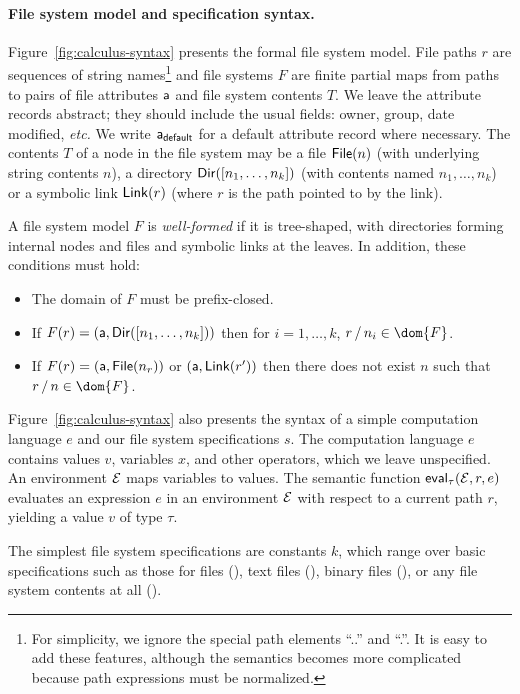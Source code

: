 \paragraph*{File system model and specification syntax.}
%
Figure~\ref{fig:calculus-syntax} presents the formal file system
model.  File paths $r$ are sequences of string names\footnote{For
  simplicity, we ignore the special path elements ``..'' and ``.''.
  It is easy to add these features, although the semantics becomes
  more complicated because path expressions must be normalized.}  and
file systems $F$ are finite partial maps from paths to pairs of file
attributes $\mathsf{a}$ and file system contents $T$.  We leave the
attribute records abstract; they should include the usual fields:
owner, group, date modified, {\it etc.}  We write $\mathsf{a}_{\mathsf{default}}$ for
a default attribute record where necessary.  The contents $T$ of a
node in the file system may be a file $\mathsf{File}(n)$ (with underlying
string contents $n$), a directory $\mathsf{Dir}( [ n_1,\dots,n_k ] )$ (with
contents named $n_1, \ldots, n_k$) or a symbolic link $\mathsf{Link}(r)$
(where $r$ is the path pointed to by the link).

A file system model $F$ is {\em well-formed} if it is tree-shaped,
with directories forming internal nodes and files and symbolic links
at the leaves.  In addition, these conditions must hold:
\begin{itemize}
\item The domain of $F$ must be prefix-closed.
\item If $F(r) = (\mathsf{a},\mathsf{Dir}( [ n_1,\dots,n_k ] ))$ then for $i=1,\ldots,k$,
$\PCons{r}{n_i} \in \dom{F}$.
\item  If $F(r) = (\mathsf{a},\mathsf{File}(n_r))$ or $(\mathsf{a},\mathsf{Link}(r'))$ then 
there does not exist $n$ such that $\PCons{r}{n} \in \dom{F}$.
\end{itemize}

Figure~\ref{fig:calculus-syntax} also presents the syntax of a simple
computation language $e$ and our file system specifications $s$.  The
computation language $e$ contains values $v$, variables $x$, and other
operators, which we leave unspecified.  An environment $\mathcal{E}$ maps
variables to values.  The semantic function $\mathsf{eval}_{\tau}(\mathcal{E},r,e)$
evaluates an expression $e$ in an environment $\mathcal{E}$ with respect to a
current path $r$, yielding a value $v$ of type $\tau$.

The simplest file system specifications are constants $k$, which range
over basic specifications such as those for files (\pfile), text files
(\ptext), binary files (\pbin), or any file system contents at all
(\pany).

